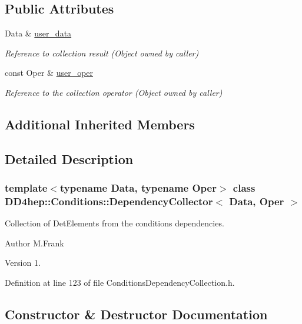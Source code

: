 \subsection*{Public Attributes}
\begin{DoxyCompactItemize}
\item 
Data \& \hyperlink{class_d_d4hep_1_1_conditions_1_1_dependency_collector_a65456b4691406f0da2334732909465a0}{user\+\_\+data}
\begin{DoxyCompactList}\small\item\em Reference to collection result (Object owned by caller) \end{DoxyCompactList}\item 
const Oper \& \hyperlink{class_d_d4hep_1_1_conditions_1_1_dependency_collector_af0056586d4f62f93837c38e0ec32ba5a}{user\+\_\+oper}
\begin{DoxyCompactList}\small\item\em Reference to the collection operator (Object owned by caller) \end{DoxyCompactList}\end{DoxyCompactItemize}
\subsection*{Additional Inherited Members}


\subsection{Detailed Description}
\subsubsection*{template$<$typename Data, typename Oper$>$\newline
class D\+D4hep\+::\+Conditions\+::\+Dependency\+Collector$<$ Data, Oper $>$}

Collection of Det\+Elements from the conditions dependencies. 

\begin{DoxyAuthor}{Author}
M.\+Frank 
\end{DoxyAuthor}
\begin{DoxyVersion}{Version}
1. 
\end{DoxyVersion}


Definition at line 123 of file Conditions\+Dependency\+Collection.\+h.



\subsection{Constructor \& Destructor Documentation}
\hypertarget{class_d_d4hep_1_1_conditions_1_1_dependency_collector_a7631c949b34eeb87fa8aea7ea166c356}{}\label{class_d_d4hep_1_1_conditions_1_1_dependency_collector_a7631c949b34eeb87fa8aea7ea166c356} 
